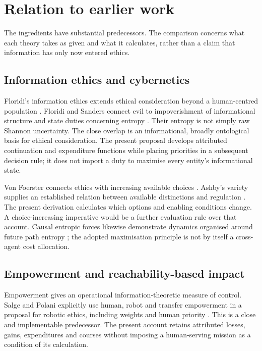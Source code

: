 \documentclass[11pt,a4paper]{article}
\theoremstyle{remark}
\begin{document}
\section{Relation to earlier work}\label{sec:related}

The ingredients have substantial predecessors. The comparison concerns what
each theory takes as given and what it calculates, rather than a claim that
information has only now entered ethics.

\subsection{Information ethics and cybernetics}

Floridi's information ethics extends ethical consideration beyond a human-centred
population \citep{floridi1999informationethics}. Floridi and Sanders connect evil
to impoverishment of informational structure and state duties concerning entropy
\citep{floridisanders1999entropy}. Their entropy is not simply raw Shannon
uncertainty. The close overlap is an informational, broadly ontological basis
for ethical consideration. The present proposal develops attributed continuation
and expenditure functions while placing priorities in a subsequent decision
rule; it does not import a duty to maximise every entity's informational state.

Von Foerster connects ethics with increasing available choices
\citep{vonfoerster2003ethics}. Ashby's variety supplies an established relation
between available distinctions and regulation \citep{ashby1956cybernetics}.
The present derivation calculates which options and enabling conditions change.
A choice-increasing imperative would be a further evaluation rule over that
account. Causal entropic forces likewise demonstrate dynamics organised around
future path entropy \citep{wissnergrossfreer2013causal}; the adopted maximisation
principle is not by itself a cross-agent cost allocation.

\subsection{Empowerment and reachability-based impact}

Empowerment gives an operational information-theoretic measure of control.
Salge and Polani explicitly use human, robot and transfer empowerment in a
proposal for robotic ethics, including weights and human priority
\citep{salgepolani2017laws}. This is a close and implementable predecessor.
The present account retains attributed losses, gains, expenditures and courses
without imposing a human-serving mission as a condition of its calculation.
\end{document}
